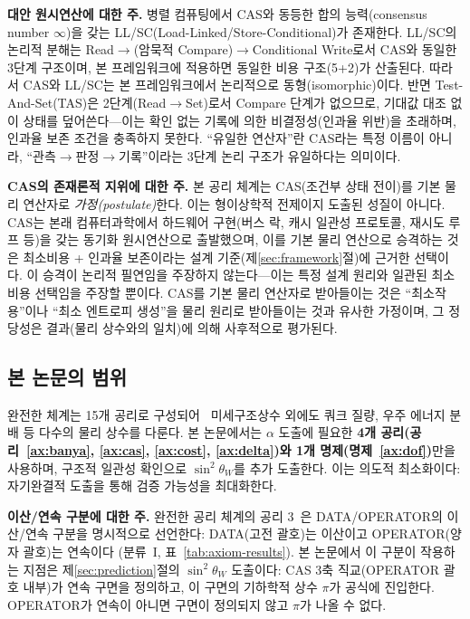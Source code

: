 \documentclass[entropy,article,submit,pdftex,oneauthor]{Definitions/mdpi}
\begin{document}
\textbf{대안 원시연산에 대한 주.} 병렬 컴퓨팅에서 CAS와 동등한 합의 능력(consensus number $\infty$)을 갖는 LL/SC(Load-Linked/Store-Conditional)가 존재한다. LL/SC의 논리적 분해는 Read$\to$(암묵적 Compare)$\to$Conditional Write로서 CAS와 동일한 3단계 구조이며, 본 프레임워크에 적용하면 동일한 비용 구조(5+2)가 산출된다. 따라서 CAS와 LL/SC는 본 프레임워크에서 논리적으로 동형(isomorphic)이다. 반면 Test-And-Set(TAS)은 2단계(Read$\to$Set)로서 Compare 단계가 없으므로, 기대값 대조 없이 상태를 덮어쓴다---이는 확인 없는 기록에 의한 비결정성(인과율 위반)을 초래하며, 인과율 보존 조건을 충족하지 못한다. ``유일한 연산자''란 CAS라는 특정 이름이 아니라, ``관측$\to$판정$\to$기록''이라는 3단계 논리 구조가 유일하다는 의미이다.

\textbf{CAS의 존재론적 지위에 대한 주.} 본 공리 체계는 CAS(조건부 상태 전이)를 기본 물리 연산자로 \emph{가정(postulate)}한다. 이는 형이상학적 전제이지 도출된 성질이 아니다. CAS는 본래 컴퓨터과학에서 하드웨어 구현(버스 락, 캐시 일관성 프로토콜, 재시도 루프 등)을 갖는 동기화 원시연산으로 출발했으며, 이를 기본 물리 연산으로 승격하는 것은 최소비용 + 인과율 보존이라는 설계 기준(제\ref{sec:framework}절)에 근거한 선택이다. 이 승격이 논리적 필연임을 주장하지 않는다---이는 특정 설계 원리와 일관된 최소비용 선택임을 주장할 뿐이다. CAS를 기본 물리 연산자로 받아들이는 것은 ``최소작용''이나 ``최소 엔트로피 생성''을 물리 원리로 받아들이는 것과 유사한 가정이며, 그 정당성은 결과(물리 상수와의 일치)에 의해 사후적으로 평가된다.

\subsection{본 논문의 범위}

완전한 체계는 15개 공리로 구성되어~\cite{han2026} 미세구조상수 외에도 쿼크 질량, 우주 에너지 분배 등 다수의 물리 상수를 다룬다. 본 논문에서는 $\alpha$ 도출에 필요한 \textbf{4개 공리(공리~\ref{ax:banya}, \ref{ax:cas}, \ref{ax:cost}, \ref{ax:delta})와 1개 명제(명제~\ref{ax:dof})}만을 사용하며, 구조적 일관성 확인으로 $\sin^2\theta_W$를 추가 도출한다. 이는 의도적 최소화이다: 자기완결적 도출을 통해 검증 가능성을 최대화한다.

\textbf{이산/연속 구분에 대한 주.} 완전한 공리 체계의 공리 3~\cite{han2026}은 DATA/OPERATOR의 이산/연속 구분을 명시적으로 선언한다: DATA(고전 괄호)는 이산이고 OPERATOR(양자 괄호)는 연속이다 (분류~I, 표~\ref{tab:axiom-results}). 본 논문에서 이 구분이 작용하는 지점은 제\ref{sec:prediction}절의 $\sin^2\theta_W$ 도출이다: CAS 3축 직교(OPERATOR 괄호 내부)가 연속 구면을 정의하고, 이 구면의 기하학적 상수 $\pi$가 공식에 진입한다. OPERATOR가 연속이 아니면 구면이 정의되지 않고 $\pi$가 나올 수 없다.
\end{document}
